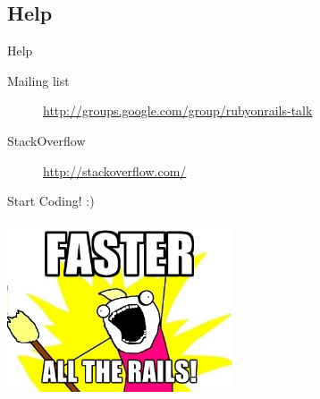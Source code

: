 \documentclass[xcolor=svgnames]{beamer}
\begin{document}
\subsection{Help}
\label{sub:Help}
\begin{frame}{Help}
\begin{description}
  \item[Mailing list] \url{http://groups.google.com/group/rubyonrails-talk}
\item[StackOverflow] \url{http://stackoverflow.com/}
\end{description}
\end{frame}
\begin{frame}{Start Coding! :)}
  \begin{center}
    \includegraphics[width=0.5\textwidth]{faster.jpg}
  \end{center}
\end{frame}
\end{document}
